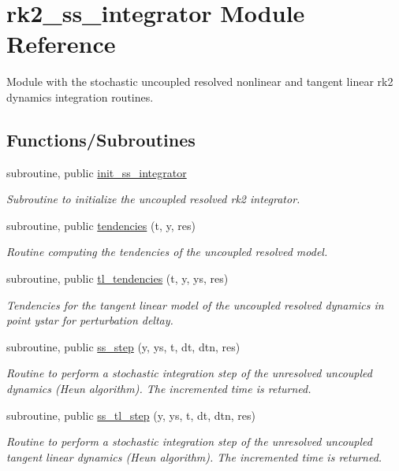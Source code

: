 \hypertarget{namespacerk2__ss__integrator}{}\section{rk2\+\_\+ss\+\_\+integrator Module Reference}
\label{namespacerk2__ss__integrator}


Module with the stochastic uncoupled resolved nonlinear and tangent linear rk2 dynamics integration routines.  


\subsection*{Functions/\+Subroutines}
\begin{DoxyCompactItemize}
\item 
subroutine, public \hyperlink{namespacerk2__ss__integrator_a6e5a498fbe46f8d573aa3af2cb3dd39c}{init\+\_\+ss\+\_\+integrator}
\begin{DoxyCompactList}\small\item\em Subroutine to initialize the uncoupled resolved rk2 integrator. \end{DoxyCompactList}\item 
subroutine, public \hyperlink{namespacerk2__ss__integrator_aebdbf0093b784435a35ecb8ef7e8bcaa}{tendencies} (t, y, res)
\begin{DoxyCompactList}\small\item\em Routine computing the tendencies of the uncoupled resolved model. \end{DoxyCompactList}\item 
subroutine, public \hyperlink{namespacerk2__ss__integrator_aa89ab291aa152abdbf23c3d6820c2156}{tl\+\_\+tendencies} (t, y, ys, res)
\begin{DoxyCompactList}\small\item\em Tendencies for the tangent linear model of the uncoupled resolved dynamics in point ystar for perturbation deltay. \end{DoxyCompactList}\item 
subroutine, public \hyperlink{namespacerk2__ss__integrator_a54ac83fe046cde7379bd09f7415f5708}{ss\+\_\+step} (y, ys, t, dt, dtn, res)
\begin{DoxyCompactList}\small\item\em Routine to perform a stochastic integration step of the unresolved uncoupled dynamics (Heun algorithm). The incremented time is returned. \end{DoxyCompactList}\item 
subroutine, public \hyperlink{namespacerk2__ss__integrator_af5eb1776d98c24b82be878c59b978b22}{ss\+\_\+tl\+\_\+step} (y, ys, t, dt, dtn, res)
\begin{DoxyCompactList}\small\item\em Routine to perform a stochastic integration step of the unresolved uncoupled tangent linear dynamics (Heun algorithm). The incremented time is returned. \end{DoxyCompactList}\end{DoxyCompactItemize}
